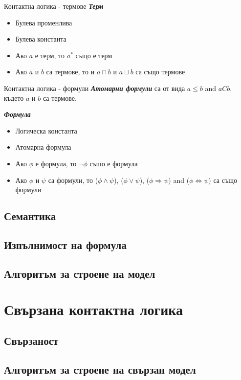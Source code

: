 \documentclass[14pt, aspectratio=169]{beamer}
\begin{document}
\begin{frame}{Контактна логика - термове}
	\textbf{\textit{Терм}}
	\begin{itemize}
		\item Булева променлива
		\item Булева константа
		\item Ако $a$ е терм, то $a^*$ също е терм
		\item Ако $a$ и $b$ са термове, то и $a \sqcap b$ и $a \sqcup b$ са също термове
	\end{itemize}
\end{frame}

\begin{frame}{Контактна логика - формули}
	\textbf{\textit{Атомарни формули}} са от вида $a \leq b$ and $aCb$, където $a$ и $b$ са термове.

	\textbf{\textit{Формула}}
	\begin{itemize}
		\item Логическа константа
		\item Атомарна формула
		\item Ако $\phi$ е формула, то $\neg\phi$  съшо е формула
		\item Ако $\phi$ и $\psi$ са формули, то ($\phi \land \psi$), ($\phi \lor \psi$), ($\phi \Rightarrow \psi$) and ($\phi \Leftrightarrow \psi$) са също формули
	\end{itemize}
\end{frame}

\subsection{Семантика}

\subsection{Изпълнимост на формула}
\subsection{Алгоритъм за строене на модел}

\section{Свързана контактна логика}
\subsection{Свързаност}
\subsection{Алгоритъм за строене на свързан модел}
\end{document}
